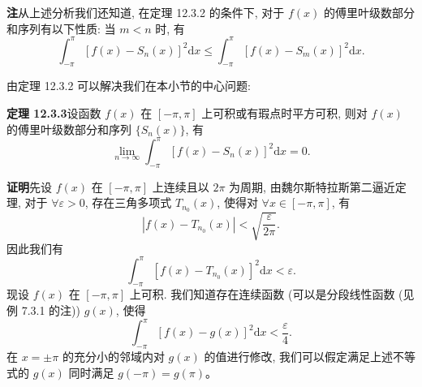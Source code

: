 \documentclass[UTF8, 12pt, fontset=fandol, oneside]{ctexart}
\begin{document}
\noindent\textbf{注}\quad 从上述分析我们还知道, 在定理 12.3.2 的条件下, 对于 $f(x)$ 的傅里叶级数部分和序列有以下性质: 当 $m<n$ 时, 有
\[
  \int_{-\pi}^{\pi}[f(x)-S_n(x)]^2\mathrm dx
  \leqslant
  \int_{-\pi}^{\pi}[f(x)-S_m(x)]^2\mathrm dx.
\]

由定理 12.3.2 可以解决我们在本小节的中心问题:

\noindent\textbf{定理 12.3.3}\quad 设函数 $f(x)$ 在 $[-\pi,\pi]$ 上可积或有瑕点时平方可积, 则对 $f(x)$ 的傅里叶级数部分和序列 $\{S_n(x)\}$, 有
\[
  \lim_{n\to\infty}\int_{-\pi}^{\pi}[f(x)-S_n(x)]^2\mathrm dx=0.
\]

\noindent\textbf{证明}\quad 先设 $f(x)$ 在 $[-\pi,\pi]$ 上连续且以 $2\pi$ 为周期, 由魏尔斯特拉斯第二逼近定理, 对于 $\forall\varepsilon>0$, 存在三角多项式 $T_{n_0}(x)$, 使得对 $\forall x\in[-\pi,\pi]$, 有
\[
  |f(x)-T_{n_0}(x)|<\sqrt{\frac{\varepsilon}{2\pi}}.
\]
因此我们有
\[
  \int_{-\pi}^{\pi}[f(x)-T_{n_0}(x)]^2\mathrm dx<\varepsilon.
\]
现设 $f(x)$ 在 $[-\pi,\pi]$ 上可积. 我们知道存在连续函数 (可以是分段线性函数 (见例 7.3.1 的注)) $g(x)$, 使得
\[
  \int_{-\pi}^{\pi}[f(x)-g(x)]^2\mathrm dx<\frac{\varepsilon}{4}.
\]
在 $x=\pm\pi$ 的充分小的邻域内对 $g(x)$ 的值进行修改, 我们可以假定满足上述不等式的 $g(x)$ 同时满足 $g(-\pi)=g(\pi)$。
\end{document}
